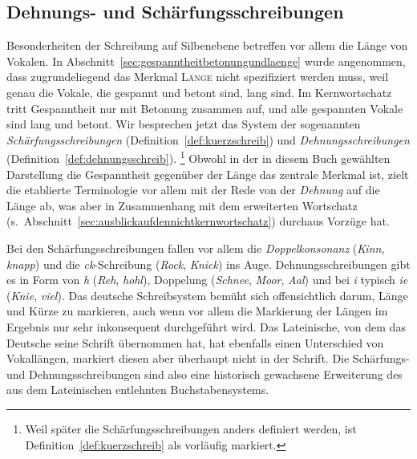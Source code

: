 \subsection{Dehnungs- und Schärfungsschreibungen}
\label{sec:dehnungsundschaerfungsschreibungen}

Besonderheiten der Schreibung auf Silbenebene betreffen vor allem die Länge von Vokalen.
In Abschnitt~\ref{sec:gespanntheitbetonungundlaenge} wurde angenommen, dass zugrundeliegend das Merkmal \textsc{Länge} nicht spezifiziert werden muss, weil genau die Vokale, die gespannt und betont sind, lang sind.
Im Kernwortschatz tritt Gespanntheit nur mit Betonung zusammen auf, und alle gespannten Vokale sind lang und betont.
Wir besprechen jetzt das System der sogenannten \textit{Schärfungsschreibungen} (Definition~\ref{def:kuerzschreib}) und \textit{Dehnungsschreibungen} (Definition~\ref{def:dehnungsschreib}).%
\footnote{Weil später die Schärfungsschreibungen anders definiert werden, ist Definition~\ref{def:kuerzschreib} als vorläufig markiert.}
Obwohl in der in diesem Buch gewählten Darstellung die Gespanntheit gegenüber der Länge das zentrale Merkmal ist, zielt die etablierte Terminologie vor allem mit der Rede von der \textit{Dehnung} auf die Länge ab, was aber in Zusammenhang mit dem erweiterten Wortschatz (s.\ Abschnitt~\ref{sec:ausblickaufdennichtkernwortschatz}) durchaus Vorzüge hat.



Bei den Schärfungsschreibungen fallen vor allem die \textit{Doppelkonsonanz} (\textit{Kinn}, \textit{knapp}) und die \textit{ck}-Schreibung (\textit{Rock}, \textit{Knick}) ins Auge.
Dehnungsschreibungen gibt es in Form von \textit{h} (\textit{Reh}, \textit{hohl}), Doppelung (\textit{Schnee}, \textit{Moor}, \textit{Aal}) und bei \textit{i} typisch \textit{ie} (\textit{Knie}, \textit{viel}).
Das deutsche Schreibsystem bemüht sich offensichtlich darum, Länge und Kürze zu markieren, auch wenn vor allem die Markierung der Längen im Ergebnis nur sehr inkonsequent durchgeführt wird.
Das Lateinische, von dem das Deutsche seine Schrift übernommen hat, hat ebenfalls einen Unterschied von Vokallängen, markiert diesen aber überhaupt nicht in der Schrift.
Die Schärfungs- und Dehnungsschreibungen sind also eine historisch gewachsene Erweiterung des aus dem Lateinischen entlehnten Buchstabensystems.

